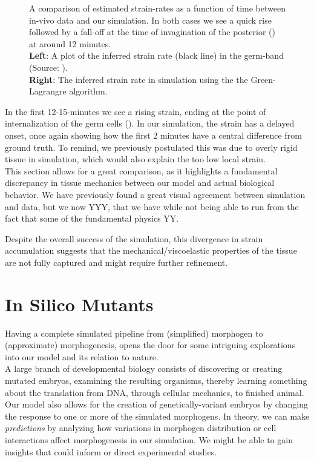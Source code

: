 \begin{figure}[H]
\begin{subfigure}{0.45\linewidth}
    \end{subfigure}
    \caption{A comparison of estimated strain-rates as a function of time between in-vivo data and our simulation. In both cases we see a quick rise followed by a fall-off at the time of invagination of the posterior () at around 12 minutes. \\\textbf{Left}: A plot of the inferred strain rate (black line) in the germ-band (Source: ). \\\textbf{Right}: The inferred strain rate in simulation using the the Green-Lagrangre algorithm.\\
   }
    \label{fig:strain}
\end{figure}

In the first 12-15-minutes we see a rising strain, ending at the point of internalization of the germ cells (). In our simulation, the strain has a delayed onset, once again showing how the first 2 minutes have a central difference from ground truth. To remind, we previously postulated this was due to overly rigid tissue in simulation, which would also explain the too low local strain. \\

This section allows for a great comparison, as it highlights a fundamental discrepancy in tissue mechanics between our model and actual biological behavior. We have previously found a great visual agreement between simulation and data, but we now YYY, that we have while not being able to run from the fact that some of the fundamental physics YY.\reph 

Despite the overall success of the simulation, this divergence in strain accumulation suggests that the mechanical/viscoelastic properties of the tissue are not fully captured and might require further refinement. 



\newpage
\section{In Silico Mutants}
Having a complete simulated pipeline from (simplified) morphogen to (approximate) morphogenesis, opens the door for some intriguing explorations into our model and its relation to nature. \\


A large branch of developmental biology consists of discovering or creating mutated embryos, examining the resulting organisms, thereby learning something about the translation from DNA, through cellular mechanics, to finished animal.\cite{gilmour2017morphogen}\reph
Our model also allows for the creation of genetically-variant embryos by changing the response to one or more of the simulated morphogens. In theory, we can make \textit{predictions} by analyzing how variations in morphogen distribution or cell interactions affect morphogenesis in our simulation. We might be able to gain insights that could inform or direct experimental studies.\\

